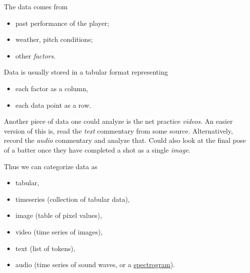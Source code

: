 The data comes from
\begin{itemize}
    \item past performance of the player;
    \item weather, pitch conditions;
    \item other \emph{factors}.
\end{itemize}

Data is usually stored in a tabular format representing
\begin{itemize}
    \item each factor as a column,
    \item each data point as a row.
\end{itemize}

Another piece of data one could analyze is the net practice \emph{videos}.
An easier version of this is, read the \emph{text} commentary from some
source.
Alternatively, record the \emph{audio} commentary and analyze that.
Could also look at the final pose of a batter once they have completed
a shot as a single \emph{image}.

Thus we can categorize data as
\begin{itemize}
    \item tabular,
    \item timeseries (collection of tabular data),
    \item image (table of pixel values),
    \item video (time series of images),
    \item text (list of tokens),
    \item audio (time series of sound waves, or a
        \href{https://en.wikipedia.org/wiki/Spectrogram}{spectrogram}).
\end{itemize}

